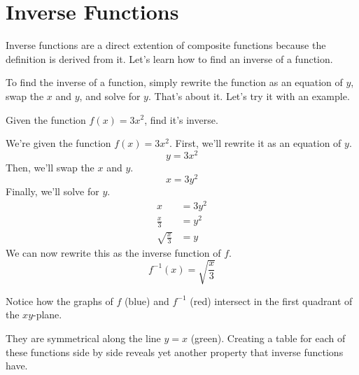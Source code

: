 \clearpage\chapter{Inverse Functions}
Inverse functions are a direct extention of composite functions because the definition is derived from it. Let's learn how to find an inverse of a function.

To find the inverse of a function, simply rewrite the function as an equation of $y$, swap the $x$ and $y$, and solve for $y$. That's about it. Let's try it with an example.

\begin{problem}
    Given the function $f(x) = 3x^2$, find it's inverse.
\end{problem}
\begin{solution}
    We're given the function $f(x) = 3x^2$. First, we'll rewrite it as an equation of $y$.
    \[
        y = 3x^2
    \]
    Then, we'll swap the $x$ and $y$.
    \[
    x = 3y^2
    \]
    Finally, we'll solve for $y$.
    \begin{align*}
    x &= 3y^2 \\
    \frac{x}{3} &= y^2 \\
    \sqrt{\frac{x}{3}} &= y
    \end{align*}
    We can now rewrite this as the inverse function of $f$.
    \[
    f^{-1}(x) = \sqrt{\frac{x}{3}}
    \]
\end{solution}
Notice how the graphs of $f$ (blue) and $f^{-1}$ (red) intersect in the first quadrant of the $xy$-plane.
\begin{center}
\end{center}
They are symmetrical along the line $y = x$ (green). Creating a table for each of these functions side by side reveals yet another property that inverse functions have.

